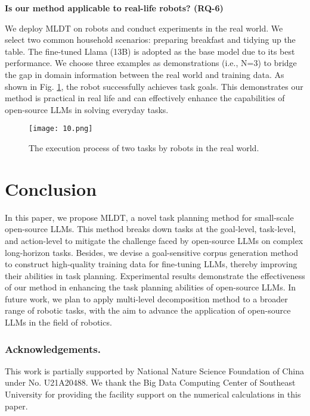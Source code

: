 \noindent \textbf{Is our method applicable to real-life robots? (RQ-6)}

We deploy MLDT on robots and conduct experiments in the real world. We select two common household scenarios: preparing breakfast and tidying up the table. The fine-tuned Llama (13B) is adopted as the base model due to its best performance. We choose three examples as demonstrations (i.e., N=3) to bridge the gap in domain information between the real world and training data. As shown in Fig. \ref{Figure 10}, the robot successfully achieves task goals. This demonstrates our method is practical in real life and can effectively enhance the capabilities of open-source LLMs in solving everyday tasks.

\begin{figure}[h]
    \centering
    \texttt{[image: 10.png]}
    \caption{The execution process of two tasks by robots in the real world.}
    \label{Figure 10}
\end{figure}

\section{Conclusion}

In this paper, we propose MLDT, a novel task planning method for small-scale open-source LLMs. This method breaks down tasks at the goal-level, task-level, and action-level to mitigate the challenge faced by open-source LLMs on complex long-horizon tasks. Besides, we devise a goal-sensitive corpus generation method to construct high-quality training data for fine-tuning LLMs, thereby improving their abilities in task planning. Experimental results demonstrate the effectiveness of our method in enhancing the task planning abilities of open-source LLMs. In future work, we plan to apply multi-level decomposition method to a broader range of robotic tasks, with the aim to advance the application of open-source LLMs in the field of robotics.

\subsubsection{Acknowledgements.} This work is partially supported by National Nature Science Foundation of China under No. U21A20488. We thank the Big Data Computing Center of Southeast University for providing the facility support on the numerical calculations in this paper.

